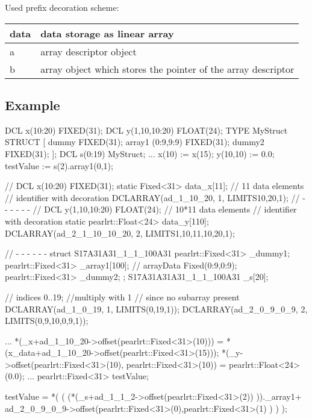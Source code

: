 Used prefix decoration scheme:

\begin{tabular}{|l|l|}
\hline
data & data storage as linear array \\
\hline
a & array descriptor object \\
\hline
b & array object which stores the pointer of the array descriptor \\
\hline
\end{tabular}

\subsection{Example}

\begin{PEARLCode}
DCL x(10:20) FIXED(31); 
DCL y(1,10,10:20) FLOAT(24); 
TYPE MyStruct STRUCT [
           dummy FIXED(31);
           array1 (0:9,9:9) FIXED(31);
           dummy2 FIXED(31);
           ];
DCL s(0:19) MyStruct;
...
x(10) := x(15);
y(10,10) := 0.0;
testValue := s(2).array1(0,1);
\end{PEARLCode}


\begin{CppCode}
// DCL x(10:20) FIXED(31); 
static Fixed<31> data_x[11]; // 11 data elements
                             // identifier with decoration
DCLARRAY(ad_1_10_20, 1, LIMITS{{10,20,1}});
// - - - - - - 
// DCL y(1,10,10:20) FLOAT(24); 
 // 10*11 data elements
 // identifier with decoration
static pearlrt::Float<24> data_y[110];
DCLARRAY(ad_2_1_10_10_20, 2, LIMITS{{1,10,11},{10,20,1}});

// - - - - - - 
   struct S17A31A31_1_1_100A31 {
      pearlrt::Fixed<31> _dummy1;
      pearlrt::Fixed<31> _array1[100];
         // arrayData Fixed(0:9,0:9);
      pearlrt::Fixed<31> _dummy2;
   } ;
   S17A31A31A31_1_1_100A31 _s[20]; 

                        // indices 0..19;
                        //multiply with 1
                        // since no subarray present
   DCLARRAY(ad_1_0_19, 1, LIMITS({{0,19,1}}));
   DCLARRAY(ad_2_0_9_0_9, 2, LIMITS({{0,9,10},{0,9,1}}));

...
   *(_x+ad_1_10_20->offset(pearlrt::Fixed<31>(10))) =
             *(x_data+ad_1_10_20->offset(pearlrt::Fixed<31>(15)));
   *(_y->offset(pearlrt::Fixed<31>(10),
            pearlrt::Fixed<31>(10)) =
                          pearlrt::Float<24>(0.0);
...
   pearlrt::Fixed<31> testValue;

   testValue = 
       *(
         (
          (*(_s+ad_1_1_2->offset(pearlrt::Fixed<31>(2)) ))._array1+
             ad_2_0_9_0_9->offset(pearlrt::Fixed<31>(0),pearlrt::Fixed<31>(1)
          )
         )
        );

\end{CppCode}

